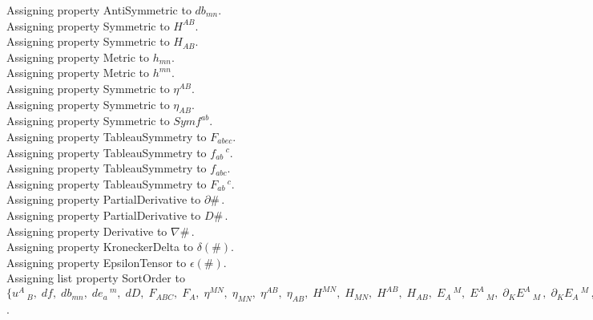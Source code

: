 \documentclass[11pt]{article}
\begin{document}
Assigning property AntiSymmetric to ${db}_{m n}$.
\\
Assigning property Symmetric to ${H}^{A B}$.
\\
Assigning property Symmetric to ${H}_{A B}$.
\\
Assigning property Metric to ${h}_{m n}$.
\\
Assigning property Metric to ${h}^{m n}$.
\\
Assigning property Symmetric to ${\eta}^{A B}$.
\\
Assigning property Symmetric to ${\eta}_{A B}$.
\\
Assigning property Symmetric to ${Symf}^{a b}$.
\\
Assigning property TableauSymmetry to ${F}_{a b ec}$.
\\
Assigning property TableauSymmetry to ${f}_{a b}\,^{c}$.
\\
Assigning property TableauSymmetry to ${f}_{a b c}$.
\\
Assigning property TableauSymmetry to ${F}_{a b}\,^{c}$.
\\
Assigning property PartialDerivative to $\partial{\#}\, $.
\\
Assigning property PartialDerivative to $D{\#}\, $.
\\
Assigning property Derivative to $\nabla{\#}\, $.
\\
Assigning property KroneckerDelta to $\delta(\#)$.
\\
Assigning property EpsilonTensor to $\epsilon(\#)$.
\\
Assigning list property SortOrder to $\{{u}^{A}\,_{B},\; df,\; {db}_{m n},\; {de}_{a}\,^{m},\; dD,\; {F}_{A B C},\; {F}_{A},\; {\eta}^{M N},\; {\eta}_{M N},\; {\eta}^{A B},\; {\eta}_{A B},\; {H}^{M N},\; {H}_{M N},\; {H}^{A B},\; {H}_{A B},\; {E}_{A}\,^{M},\; {E}^{A}\,_{M},\; {\partial}_{K}{{E}^{A}\,_{M}}\, ,\; {\partial}_{K}{{E}_{A}\,^{M}}\, ,\; {\partial}_{K L}{{E}_{A}\,^{M}}\, \}$.
\end{document}
